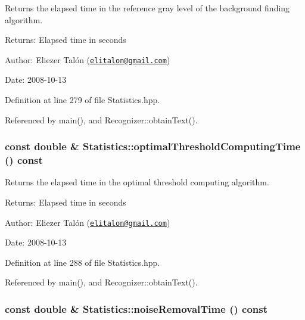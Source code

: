 Returns the elapsed time in the reference gray level of the background finding algorithm. 

\begin{Desc}
\item[Returns:]Elapsed time in seconds\end{Desc}
\begin{Desc}
\item[Author:]Eliezer Talón (\href{mailto:elitalon@gmail.com}{\tt elitalon@gmail.com}) \end{Desc}
\begin{Desc}
\item[Date:]2008-10-13 \end{Desc}


Definition at line 279 of file Statistics.hpp.

Referenced by main(), and Recognizer::obtainText().\hypertarget{class_statistics_87bdb5b4f7a88cb74d0072fd0c7a2248}{
\subsubsection[optimalThresholdComputingTime]{\setlength{\rightskip}{0pt plus 5cm}const double \& Statistics::optimalThresholdComputingTime () const}}
\label{class_statistics_87bdb5b4f7a88cb74d0072fd0c7a2248}


Returns the elapsed time in the optimal threshold computing algorithm. 

\begin{Desc}
\item[Returns:]Elapsed time in seconds\end{Desc}
\begin{Desc}
\item[Author:]Eliezer Talón (\href{mailto:elitalon@gmail.com}{\tt elitalon@gmail.com}) \end{Desc}
\begin{Desc}
\item[Date:]2008-10-13 \end{Desc}


Definition at line 288 of file Statistics.hpp.

Referenced by main(), and Recognizer::obtainText().\hypertarget{class_statistics_ba44f1b2567a77f99ee15c11bda6312a}{
\subsubsection[noiseRemovalTime]{\setlength{\rightskip}{0pt plus 5cm}const double \& Statistics::noiseRemovalTime () const}}
\label{class_statistics_ba44f1b2567a77f99ee15c11bda6312a}


